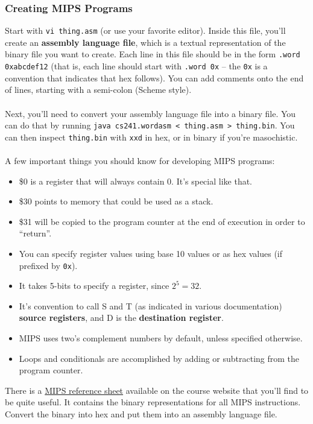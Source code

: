 \documentclass[]{article}
\theoremstyle{definition}
\begin{document}
			\subsubsection{Creating MIPS Programs}
			Start with \verb+vi thing.asm+ (or use your favorite editor). Inside this file, you'll create an \textbf{assembly language file}, which is a textual representation of the binary file you want to create. Each line in this file should be in the form \verb+.word 0xabcdef12+ (that is, each line should start with \verb+.word 0x+ -- the \verb+0x+ is a convention that indicates that hex follows). You can add comments onto the end of lines, starting with a semi-colon (Scheme style).
			\\ \\
			Next, you'll need to convert your assembly language file into a binary file. You can do that by running \verb+java cs241.wordasm < thing.asm > thing.bin+. You can then inspect \verb+thing.bin+ with \verb+xxd+ in hex, or in binary if you're masochistic.
			\\ \\
			A few important things you should know for developing MIPS programs:
			\begin{itemize}
				\item \$0 is a register that will always contain 0. It's special like that.
				\item \$30 points to memory that could be used as a stack.
				\item \$31 will be copied to the program counter at the end of execution in order to ``return''.
				\item You can specify register values using base 10 values or as hex values (if prefixed by \verb+0x+). 
				\item It takes 5-bits to specify a register, since $2^5 = 32$. 
				\item It's convention to call S and T (as indicated in various documentation) \textbf{source registers}, and D is the \textbf{destination register}. 
				\item MIPS uses two's complement numbers by default, unless specified otherwise.
				\item Loops and conditionals are accomplished by adding or subtracting from the program counter.
			\end{itemize}
			
			There is a \href{https://www.student.cs.uwaterloo.ca/~cs241/mips/mipsref.pdf}{MIPS reference sheet} available on the course website that you'll find to be quite useful. It contains the binary representations for all MIPS instructions. Convert the binary into hex and put them into an assembly language file.
		
\end{document}

